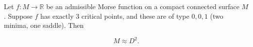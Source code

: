 Let $f: M \to \mathbb{R}$ be an admissible Morse function on a compact connected surface $M$. Suppose $f$ has exactly 3 critical points, and these are of type $0, 0, 1$ (two minima, one saddle). Then

$$M \approx D^2.$$
